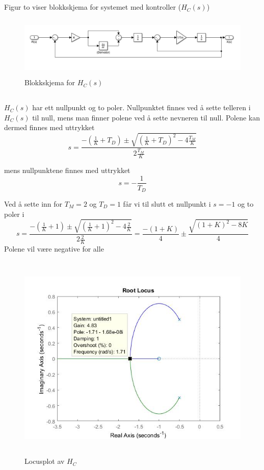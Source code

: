 \documentclass[norsk]{article}
\begin{document}
\subsection{ }
Figur to viser blokkskjema for systemet med kontroller (\(H_C(s)\))
\begin{figure}[!htb]
\includegraphics[height=2.9cm]{illustrations/oppg1d_illu}
\caption{Blokkskjema for \(H_C(s)\)}
\end{figure}

\subsection{ }
\(H_C(s)\) har ett nullpunkt og to poler. Nullpunktet finnes ved å sette telleren i \(H_C(s)\) til null, mens man finner polene ved å sette nevneren til null. Polene kan dermed finnes med uttrykket
\[s = \frac{-(\frac{1}{K} + T_D) \pm \sqrt{(\frac{1}{K} + T_D)^2 - 4\frac{T_M}{K}}}{2\frac{T_M}{K}}\]

mens nullpunktene finnes med uttrykket
\[s = -\frac{1}{T_D}\]

Ved å sette inn for \(T_M = 2\) og \(T_D = 1\) får vi til slutt et nullpunkt i \(s = -1\) og to poler i
\[s = \frac{-(\frac{1}{K} + 1) \pm \sqrt{(\frac{1}{K} + 1)^2 - 4\frac{2}{K}}}{2\frac{2}{K}} = \frac{-(1+K)}{4}\pm\frac{\sqrt{(1+K)^2-8K}}{4}\]
Polene vil være negative for alle 

\begin{figure}[!htb]
\includegraphics[height=10cm]{illustrations/oppg1e_illu}
\caption{Locusplot av \(H_C\)}
\end{figure}
\end{document}
